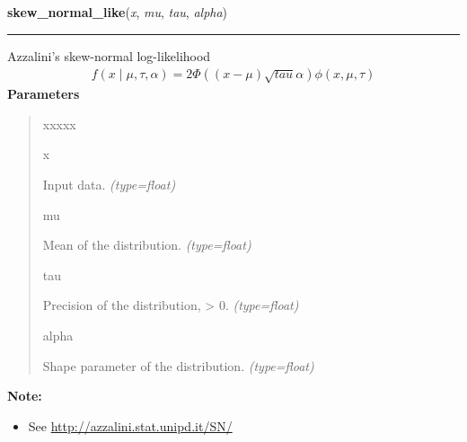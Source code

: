     \vspace{0.5ex}

\hspace{.8\funcindent}\begin{boxedminipage}{\funcwidth}

    \raggedright \textbf{skew\_normal\_like}(\textit{x}, \textit{mu}, \textit{tau}, \textit{alpha})

    \vspace{-1.5ex}

    \rule{\textwidth}{0.5\fboxrule}
\setlength{\parskip}{2ex}

Azzalini's skew-normal log-likelihood
\begin{equation*}\begin{split}f(x \mid \mu, \tau, \alpha) = 2 \Phi((x-\mu)\sqrt{tau}\alpha) \phi(x,\mu,\tau)\end{split}\end{equation*}\setlength{\parskip}{1ex}
      \textbf{Parameters}
      \vspace{-1ex}

      \begin{quote}
        \begin{Ventry}{xxxxx}

          \item[x]


Input data.
            {\it (type=float)}

          \item[mu]


Mean of the distribution.
            {\it (type=float)}

          \item[tau]


Precision of the distribution, {\textgreater} 0.
            {\it (type=float)}

          \item[alpha]


Shape parameter of the distribution.
            {\it (type=float)}

        \end{Ventry}

      \end{quote}

\textbf{Note:} \begin{itemize}
\item {} 
See \href{http://azzalini.stat.unipd.it/SN/}{http://azzalini.stat.unipd.it/SN/}

\end{itemize}


    \end{boxedminipage}

